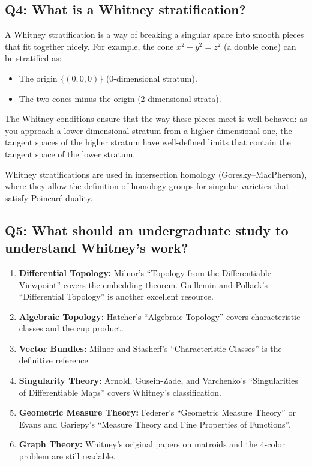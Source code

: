 \subsection*{Q4: What is a Whitney stratification?}

A Whitney stratification is a way of breaking a singular space into smooth pieces that fit together nicely. For example, the cone $x^2 + y^2 = z^2$ (a double cone) can be stratified as:
\begin{itemize}
    \item The origin $\{(0,0,0)\}$ (0-dimensional stratum).
    \item The two cones minus the origin (2-dimensional strata).
\end{itemize}

The Whitney conditions ensure that the way these pieces meet is well-behaved: as you approach a lower-dimensional stratum from a higher-dimensional one, the tangent spaces of the higher stratum have well-defined limits that contain the tangent space of the lower stratum.

Whitney stratifications are used in intersection homology (Goresky--MacPherson), where they allow the definition of homology groups for singular varieties that satisfy Poincar{\'e} duality.

\subsection*{Q5: What should an undergraduate study to understand Whitney's work?}

\begin{enumerate}
    \item \textbf{Differential Topology:} Milnor's ``Topology from the Differentiable Viewpoint'' covers the embedding theorem. Guillemin and Pollack's ``Differential Topology'' is another excellent resource.
    \item \textbf{Algebraic Topology:} Hatcher's ``Algebraic Topology'' covers characteristic classes and the cup product.
    \item \textbf{Vector Bundles:} Milnor and Stasheff's ``Characteristic Classes'' is the definitive reference.
    \item \textbf{Singularity Theory:} Arnold, Gusein-Zade, and Varchenko's ``Singularities of Differentiable Maps'' covers Whitney's classification.
    \item \textbf{Geometric Measure Theory:} Federer's ``Geometric Measure Theory'' or Evans and Gariepy's ``Measure Theory and Fine Properties of Functions''.
    \item \textbf{Graph Theory:} Whitney's original papers on matroids and the 4-color problem are still readable.
\end{enumerate}

